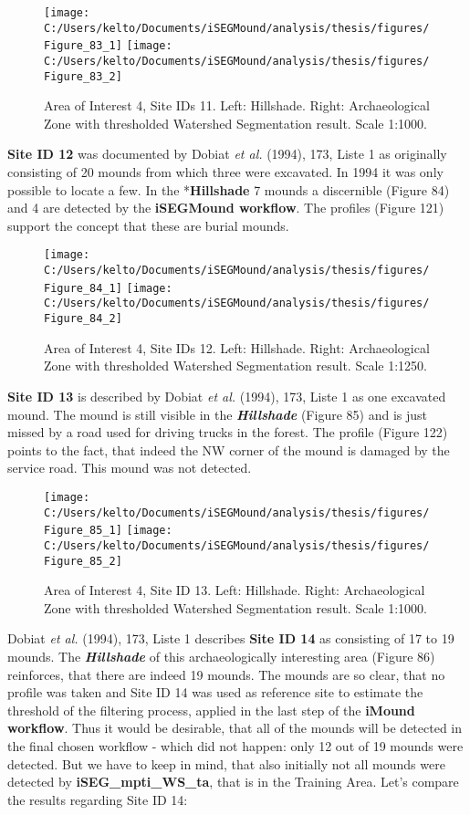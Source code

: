 \documentclass[
  12pt,
]{article}
\begin{document}
\begin{figure}
\texttt{[image: C:/Users/kelto/Documents/iSEGMound/analysis/thesis/figures/Figure\_83\_1]} \texttt{[image: C:/Users/kelto/Documents/iSEGMound/analysis/thesis/figures/Figure\_83\_2]} \caption{Area of Interest 4, Site IDs 11. Left: Hillshade. Right: Archaeological Zone with thresholded Watershed Segmentation result. Scale 1:1000.}\label{fig:Figure83}
\end{figure}

\textbf{Site ID 12} was documented by Dobiat \emph{et al.} (1994), 173, Liste 1 as originally consisting of 20 mounds from which three were excavated. In 1994 it was only possible to locate a few. In the *\textbf{Hillshade} 7 mounds a discernible (Figure 84) and 4 are detected by the \textbf{iSEGMound workflow}. The profiles (Figure 121) support the concept that these are burial mounds.

\begin{figure}
\texttt{[image: C:/Users/kelto/Documents/iSEGMound/analysis/thesis/figures/Figure\_84\_1]} \texttt{[image: C:/Users/kelto/Documents/iSEGMound/analysis/thesis/figures/Figure\_84\_2]} \caption{Area of Interest 4, Site IDs 12. Left: Hillshade. Right: Archaeological Zone with thresholded Watershed Segmentation result. Scale 1:1250.}\label{fig:Figure84}
\end{figure}

\textbf{Site ID 13} is described by Dobiat \emph{et al.} (1994), 173, Liste 1 as one excavated mound. The mound is still visible in the \textbf{\emph{Hillshade}} (Figure 85) and is just missed by a road used for driving trucks in the forest. The profile (Figure 122) points to the fact, that indeed the NW corner of the mound is damaged by the service road. This mound was not detected.

\begin{figure}
\texttt{[image: C:/Users/kelto/Documents/iSEGMound/analysis/thesis/figures/Figure\_85\_1]} \texttt{[image: C:/Users/kelto/Documents/iSEGMound/analysis/thesis/figures/Figure\_85\_2]} \caption{Area of Interest 4, Site ID 13. Left: Hillshade. Right: Archaeological Zone with thresholded Watershed Segmentation result. Scale 1:1000.}\label{fig:Figure85}
\end{figure}

Dobiat \emph{et al.} (1994), 173, Liste 1 describes \textbf{Site ID 14} as consisting of 17 to 19 mounds. The \textbf{\emph{Hillshade}} of this archaeologically interesting area (Figure 86) reinforces, that there are indeed 19 mounds. The mounds are so clear, that no profile was taken and Site ID 14 was used as reference site to estimate the threshold of the filtering process, applied in the last step of the \textbf{iMound workflow}. Thus it would be desirable, that all of the mounds will be detected in the final chosen workflow - which did not happen: only 12 out of 19 mounds were detected. But we have to keep in mind, that also initially not all mounds were detected by \textbf{iSEG\_mpti\_WS\_ta}, that is in the Training Area. Let's compare the results regarding Site ID 14:
\end{document}
